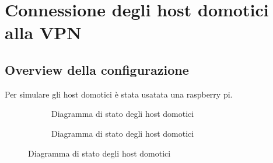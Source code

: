 
\chapter{Connessione degli host domotici alla VPN}

\section{Overview della configurazione}

Per simulare gli host domotici è stata usatata una raspberry pi.

\begin{figure}[H]
    \centering
    \begin{subfigure}{0.44\linewidth}
        \centering
        \usebox{\myimage}
        \caption{Diagramma di stato degli host domotici}
        \label{fig:diag2-host}
    \end{subfigure}
    \hfill
    \begin{subfigure}{0.53\linewidth}
        \centering
        \caption{Diagramma di stato degli host domotici}
        \label{fig:diag2-host1}
    \end{subfigure}
\end{figure}


